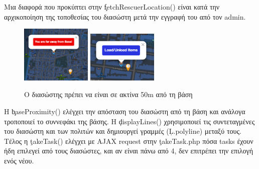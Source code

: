         Μια διαφορά που προκύπτει στην \c{fetchRescuerLocation()} είναι κατά την αρχικοποίηση της τοποθεσίας του διασώστη μετά την εγγραφή του από τον admin.

        \begin{figure}[H] \noindent \centering
            \includegraphics[width=0.3\textwidth]{img/rescuer-marker1}
            \includegraphics[width=0.3\textwidth]{img/rescuer-marker2}
            \caption{Ο διασώστης πρέπει να είναι σε ακτίνα 50m από τη βάση}
        \end{figure}

        Η \c{baseProximity()} ελέγχει την απόσταση του διασώστη από τη βάση και ανάλογα τροποποιεί το συννεφάκι της βάσης.
        Η \c{displayLines()} χρησιμοποιεί τις συντεταγμένες του διασώστη και των πολιτών και δημιουργεί γραμμές (\c{L.polyline}) μεταξύ τους.
        Τέλος η \c{takeTask()} ελέγχει με AJAX request στην \c{takeTask.php} πόσα tasks έχουν ήδη επιλεγεί από τους διασώστες, και αν είναι πάνω από 4, δεν επιτρέπει την επιλογή ενός νέου.